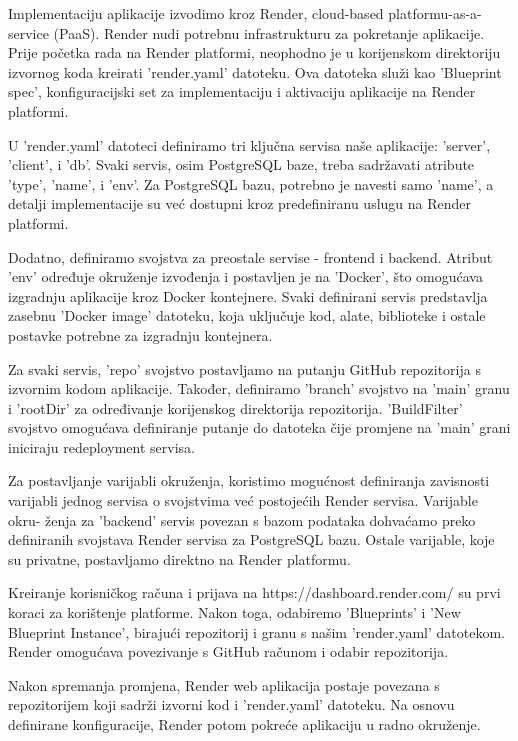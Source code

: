 		Implementaciju aplikacije izvodimo kroz Render, cloud-based platformu-as-a-service (PaaS). Render nudi potrebnu infrastrukturu za pokretanje aplikacije. Prije početka rada na Render platformi, neophodno je u korijenskom direktoriju izvornog koda kreirati 'render.yaml' datoteku. Ova datoteka služi kao 'Blueprint spec', konfiguracijski set za implementaciju i aktivaciju aplikacije na Render platformi.

		U 'render.yaml' datoteci definiramo tri ključna servisa naše aplikacije: 'server', 'client', i 'db'. Svaki servis, osim PostgreSQL baze, treba sadržavati atribute 'type', 'name', i 'env'. Za PostgreSQL bazu, potrebno je navesti samo 'name', a detalji implementacije su već dostupni kroz predefiniranu uslugu na Render platformi.

		Dodatno, definiramo svojstva za preostale servise - frontend i backend. Atribut 'env' određuje okruženje izvođenja i postavljen je na 'Docker', što omogućava izgradnju aplikacije kroz Docker kontejnere. Svaki definirani servis predstavlja zasebnu 'Docker image' datoteku, koja uključuje kod, alate, biblioteke i ostale postavke potrebne za izgradnju kontejnera.

		Za svaki servis, 'repo' svojstvo postavljamo na putanju GitHub repozitorija s izvornim kodom aplikacije. Također, definiramo 'branch' svojstvo na 'main' granu i 'rootDir' za određivanje korijenskog direktorija repozitorija. 'BuildFilter' svojstvo omogućava definiranje putanje do datoteka čije promjene na 'main' grani iniciraju redeployment servisa.

		Za postavljanje varijabli okruženja, koristimo mogućnost definiranja zavisnosti varijabli jednog servisa o svojstvima već postojećih Render servisa. Varijable okru- ženja za 'backend' servis povezan s bazom podataka dohvaćamo preko definiranih svojstava Render servisa za PostgreSQL bazu. Ostale varijable, koje su privatne, postavljamo direktno na Render platformu.

		Kreiranje korisničkog računa i prijava na https://dashboard.render.com/ su prvi koraci za korištenje platforme. Nakon toga, odabiremo 'Blueprints' i 'New Blueprint Instance', birajući repozitorij i granu s našim 'render.yaml' datotekom. Render omogućava povezivanje s GitHub računom i odabir repozitorija.

		Nakon spremanja promjena, Render web aplikacija postaje povezana s repozitorijem koji sadrži izvorni kod i 'render.yaml' datoteku. Na osnovu definirane konfiguracije, Render potom pokreće aplikaciju u radno okruženje.

